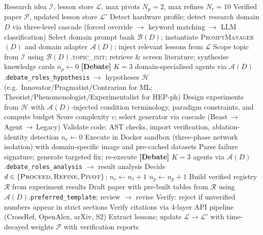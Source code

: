 \begin{algorithm}[t]
\caption{\system{}: Autonomous Research Pipeline with Domain-Aware Routing}
\label{alg:pipeline}
\small
\begin{algorithmic}[1]
\REQUIRE Research idea $\mathcal{I}$, lesson store $\mathcal{L}$, max pivots $N_p{=}2$, max refines $N_r{=}10$
\ENSURE Verified paper $\mathcal{P}$, updated lesson store $\mathcal{L}'$
\STATE Detect hardware profile; detect research domain $D$ via three-level cascade
       (forced override $\to$ keyword matching $\to$ LLM classification)
\STATE Select domain prompt bank $\mathcal{B}(D)$; instantiate \textsc{PromptManager}$(D)$
       and domain adapter $\mathcal{A}(D)$; inject relevant lessons from $\mathcal{L}$
\STATE Scope topic from $\mathcal{I}$ using $\mathcal{B}(D)$.\textsc{topic\_init};
       retrieve \& screen literature; synthesise knowledge cards
\STATE $n_p \gets 0$
\REPEAT
    \STATE \textbf{[Debate]} $K{=}3$ domain-specialised agents via $\mathcal{A}(D)$.\texttt{debate\_roles\_hypothesis}
           $\to$ hypotheses $\mathcal{H}$ (e.g.\ Innovator/Pragmatist/Contrarian for ML;
           Theorist/Phenomenologist/Experimentalist for HEP-ph)
    \STATE Design experiments from $\mathcal{H}$ with $\mathcal{A}(D)$-injected condition
           terminology, paradigm constraints, and compute budget
    \STATE Score complexity $c$; select generator via cascade (Beast\,$\to$\,Agent\,$\to$\,Legacy)
    \STATE Validate code: AST checks, import verification, ablation-identity detection
    \STATE $n_r \gets 0$
    \REPEAT
        \STATE Execute in Docker sandbox (three-phase network isolation) with
               domain-specific image and pre-cached datasets
            \STATE Parse failure signature; generate targeted fix; re-execute
        \ENDWHILE
        \STATE \textbf{[Debate]} $K{=}3$ agents via $\mathcal{A}(D)$.\texttt{debate\_roles\_analysis}
               $\to$ result analysis
        \STATE Decide $d \in \{\textsc{Proceed}, \textsc{Refine}, \textsc{Pivot}\}$; $n_r \gets n_r + 1$
    \STATE $n_p \gets n_p + 1$
\STATE Build verified registry $\mathcal{R}$ from experiment results
\STATE Draft paper with pre-built tables from $\mathcal{R}$ using $\mathcal{A}(D)$.\texttt{preferred\_template};
       review $\to$ revise
\STATE Verify: reject if unverified numbers appear in strict sections
\STATE Verify citations via 4-layer API pipeline (CrossRef, OpenAlex, arXiv, S2)
\STATE Extract lessons; update $\mathcal{L} \to \mathcal{L}'$ with time-decayed weights
\RETURN $\mathcal{P}$ with verification reports
\end{algorithmic}
\end{algorithm}

